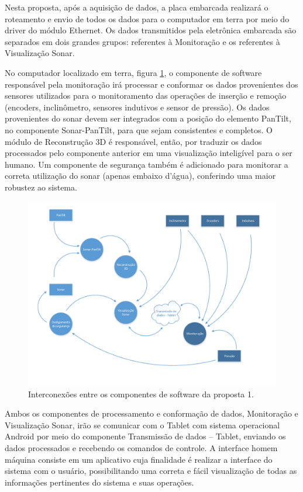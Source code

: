 Nesta proposta, após a aquisição de dados, a placa embarcada realizará o
roteamento e envio de todos os dados para o computador em terra por meio do
driver do módulo Ethernet.  Os dados transmitidos pela eletrônica embarcada são
separados em dois grandes grupos: referentes à Monitoração e os referentes à
Visualização Sonar.

No computador localizado em terra, figura \ref{fig:ES:1}, o componente de
software responsável pela monitoração irá processar e conformar os dados
provenientes dos sensores utilizados para o monitoramento das operações de
inserção e remoção (encoders, inclinômetro, sensores indutivos e sensor de
pressão). Os dados provenientes do sonar devem ser integrados com a posição do
elemento PanTilt, no componente Sonar-PanTilt, para que sejam consistentes e
completos.  O módulo de Reconstrução 3D é responsável, então, por traduzir os
dados processados pelo componente anterior em uma visualização inteligível para
o ser humano.  Um componente de segurança também é adicionado para monitorar a
correta utilização do sonar (apenas embaixo d’água), conferindo uma maior
robustez ao sistema.

\begin{figure}[H] 
\centering
\includegraphics[width=\textwidth,height=\textheight,keepaspectratio]{figs/software/EstrutSoft/prop1_soft_2.pdf}
\caption{Interconexões entre os componentes de software da proposta 1.}
\label{fig:ES:1}
\end{figure}

Ambos os componentes de processamento e conformação de dados, Monitoração e
Visualização Sonar, irão se comunicar com o Tablet com sistema operacional
Android por meio do componente Transmissão de dados – Tablet, enviando os dados
processados e recebendo os comandos de controle.  A interface homem máquina
consiste em um aplicativo cuja finalidade é realizar a interface do sistema com
o usuário, possibilitando uma correta e fácil visualização de todas as
informações pertinentes do sistema e suas operações.